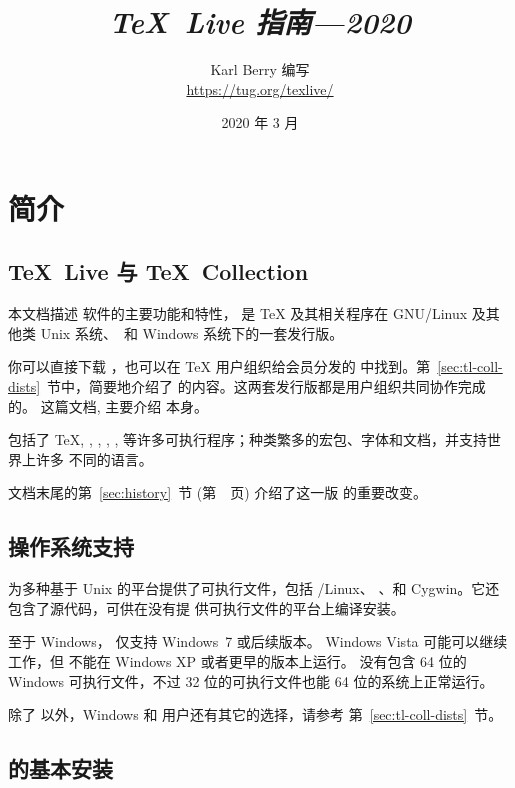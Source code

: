 \documentclass{article}
\title{%
  {\huge \textit{\TeX\ Live 指南---2020}}%
}
\author{Karl Berry 编写 \\[3mm]
        \url{https://tug.org/texlive/}
      }
\date{2020 年 3 月}
\begin{document}
\maketitle

\begin{multicols}{2}
  \tableofcontents
\end{multicols}

\section{简介}
\label{sec:intro}

\subsection{\protect\TeX\protect\ Live 与 \protect\TeX\protect\ Collection}

本文档描述 \TL{} 软件的主要功能和特性，\TL{} 是 \TeX{} 及其相关程序在
GNU/Linux 及其他类 Unix 系统、\MacOSX\ 和 Windows
系统下的一套发行版。

你可以直接下载 \TL{}，也可以在 \TeX{} 用户组织给会员分发的 \TK{}
\DVD 中找到。第~\ref{sec:tl-coll-dists}~节中，简要地介绍了
\DVD 的内容。这两套发行版都是用户组织共同协作完成的。
这篇文档, 主要介绍 \TL{} 本身。

\TL{} 包括了 \TeX{}, \LaTeXe{}, \ConTeXt, \MF, \MP, \BibTeX{}
等许多可执行程序；种类繁多的宏包、字体和文档，并支持世界上许多
不同的语言。

文档末尾的第~\ref{sec:history}~节 (第~\pageref{sec:history}~页)
介绍了这一版 \TL{} 的重要改变。

\subsection{操作系统支持}
\label{sec:os-support}

\TL{} 为多种基于 Unix 的平台提供了可执行文件，包括 \GNU/Linux、
\MacOSX{}、和 Cygwin。它还包含了源代码，可供在没有提
供可执行文件的平台上编译安装。

至于 Windows，\TL{} 仅支持 Windows~7 或后续版本。
Windows Vista 可能可以继续工作，但 \TL{} 不能在 Windows XP
或者更早的版本上运行。\TL{} 没有包含 64 位的 Windows
可执行文件，不过 32 位的可执行文件也能 64 位的系统上正常运行。

除了 \TL{} 以外，Windows 和 \MacOSX 用户还有其它的选择，请参考
第~\ref{sec:tl-coll-dists}~节。

\subsection{\protect\TL{} 的基本安装}
\label{sec:basic}
\end{document}
